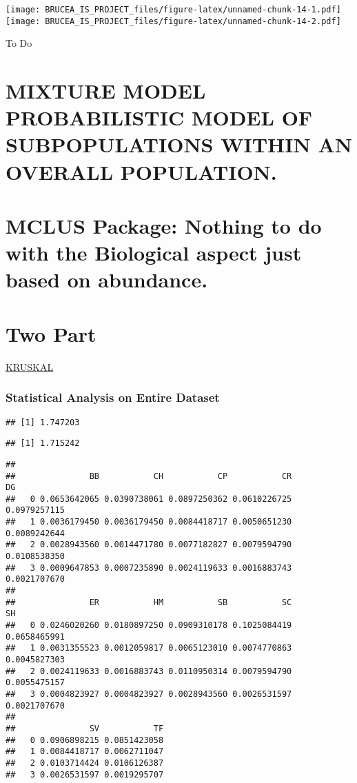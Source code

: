 \documentclass[
]{article}
\begin{document}
\texttt{[image: BRUCEA\_IS\_PROJECT\_files/figure-latex/unnamed-chunk-14-1.pdf]}
\texttt{[image: BRUCEA\_IS\_PROJECT\_files/figure-latex/unnamed-chunk-14-2.pdf]}

To Do

\hypertarget{mixture-model-probabilistic-model-of-subpopulations-within-an-overall-population.}{%
\section{MIXTURE MODEL PROBABILISTIC MODEL OF SUBPOPULATIONS WITHIN AN
OVERALL
POPULATION.}\label{mixture-model-probabilistic-model-of-subpopulations-within-an-overall-population.}}

\hypertarget{mclus-package-nothing-to-do-with-the-biological-aspect-just-based-on-abundance.}{%
\section{MCLUS Package: Nothing to do with the Biological aspect just
based on
abundance.}\label{mclus-package-nothing-to-do-with-the-biological-aspect-just-based-on-abundance.}}

\hypertarget{two-part}{%
\section{Two Part}\label{two-part}}

\href{https://statistics.laerd.com/spss-tutorials/kruskal-wallis-h-test-using-spss-statistics.php}{KRUSKAL}

\hypertarget{statistical-analysis-on-entire-dataset}{%
\subsubsection{Statistical Analysis on Entire
Dataset}\label{statistical-analysis-on-entire-dataset}}

\begin{verbatim}
## [1] 1.747203
\end{verbatim}

\begin{verbatim}
## [1] 1.715242
\end{verbatim}

\begin{verbatim}
##    
##               BB           CH           CP           CR           DG
##   0 0.0653642065 0.0390738061 0.0897250362 0.0610226725 0.0979257115
##   1 0.0036179450 0.0036179450 0.0084418717 0.0050651230 0.0089242644
##   2 0.0028943560 0.0014471780 0.0077182827 0.0079594790 0.0108538350
##   3 0.0009647853 0.0007235890 0.0024119633 0.0016883743 0.0021707670
##    
##               ER           HM           SB           SC           SH
##   0 0.0246020260 0.0180897250 0.0909310178 0.1025084419 0.0658465991
##   1 0.0031355523 0.0012059817 0.0065123010 0.0074770863 0.0045827303
##   2 0.0024119633 0.0016883743 0.0110950314 0.0079594790 0.0055475157
##   3 0.0004823927 0.0004823927 0.0028943560 0.0026531597 0.0021707670
##    
##               SV           TF
##   0 0.0906898215 0.0851423058
##   1 0.0084418717 0.0062711047
##   2 0.0103714424 0.0106126387
##   3 0.0026531597 0.0019295707
\end{verbatim}
\end{document}
